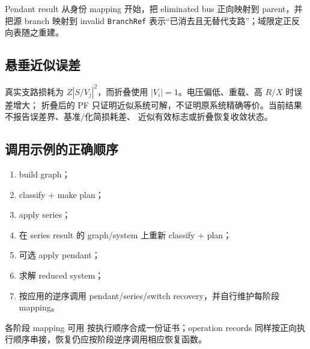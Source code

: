 Pendant result 从身份 mapping 开始，把 eliminated bus 正向映射到 parent，并把源 branch 映射到
invalid \texttt{BranchRef} 表示“已消去且无替代支路”；域限定正反向表随之重建。

\subsection{悬垂近似误差}

真实支路损耗为 $Z|S/V_j|^2$，而折叠使用 $|V_i|=1$。电压偏低、重载、高 $R/X$ 时误差增大；
折叠后的 PF 只证明近似系统可解，不证明原系统精确等价。当前结果不报告误差界、基准/化简损耗差、
近似有效标志或折叠恢复收敛状态。

\subsection{调用示例的正确顺序}

\begin{enumerate}
  \item build graph；
  \item classify + make plan；
  \item apply series；
  \item 在 series result 的 graph/system 上重新 classify + plan；
  \item 可选 apply pendant；
  \item 求解 reduced system；
  \item 按应用的逆序调用 pendant/series/switch recovery，并自行维护每阶段 mapping。
\end{enumerate}
各阶段 mapping 可用  按执行顺序合成一份证书；operation
records 同样按正向执行顺序串接，恢复仍应按阶段逆序调用相应恢复函数。
